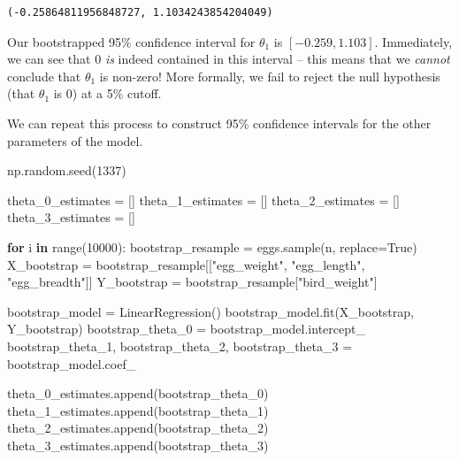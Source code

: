 \documentclass[
  letterpaper,
  DIV=11,
  numbers=noendperiod]{scrreprt}
\newenvironment{Shaded}{\begin{snugshade}}{\end{snugshade}}
\newcommand{\BuiltInTok}[1]{\textcolor[rgb]{0.00,0.23,0.31}{#1}}
\newcommand{\ControlFlowTok}[1]{\textcolor[rgb]{0.00,0.23,0.31}{\textbf{#1}}}
\newcommand{\DecValTok}[1]{\textcolor[rgb]{0.68,0.00,0.00}{#1}}
\newcommand{\KeywordTok}[1]{\textcolor[rgb]{0.00,0.23,0.31}{\textbf{#1}}}
\newcommand{\NormalTok}[1]{\textcolor[rgb]{0.00,0.23,0.31}{#1}}
\newcommand{\OperatorTok}[1]{\textcolor[rgb]{0.37,0.37,0.37}{#1}}
\newcommand{\StringTok}[1]{\textcolor[rgb]{0.13,0.47,0.30}{#1}}
\newcommand{\VariableTok}[1]{\textcolor[rgb]{0.07,0.07,0.07}{#1}}
\begin{document}
\begin{verbatim}
(-0.25864811956848727, 1.1034243854204049)
\end{verbatim}

Our bootstrapped 95\% confidence interval for \(\theta_1\) is
\([-0.259, 1.103]\). Immediately, we can see that 0 \emph{is} indeed
contained in this interval -- this means that we \emph{cannot} conclude
that \(\theta_1\) is non-zero! More formally, we fail to reject the null
hypothesis (that \(\theta_1\) is 0) at a 5\% cutoff.

We can repeat this process to construct 95\% confidence intervals for
the other parameters of the model.

\begin{Shaded}
\begin{Highlighting}[]
\NormalTok{np.random.seed(}\DecValTok{1337}\NormalTok{)}

\NormalTok{theta\_0\_estimates }\OperatorTok{=}\NormalTok{ []}
\NormalTok{theta\_1\_estimates }\OperatorTok{=}\NormalTok{ []}
\NormalTok{theta\_2\_estimates }\OperatorTok{=}\NormalTok{ []}
\NormalTok{theta\_3\_estimates }\OperatorTok{=}\NormalTok{ []}


\ControlFlowTok{for}\NormalTok{ i }\KeywordTok{in} \BuiltInTok{range}\NormalTok{(}\DecValTok{10000}\NormalTok{):}
\NormalTok{    bootstrap\_resample }\OperatorTok{=}\NormalTok{ eggs.sample(n, replace}\OperatorTok{=}\VariableTok{True}\NormalTok{)}
\NormalTok{    X\_bootstrap }\OperatorTok{=}\NormalTok{ bootstrap\_resample[[}\StringTok{"egg\_weight"}\NormalTok{, }\StringTok{"egg\_length"}\NormalTok{, }\StringTok{"egg\_breadth"}\NormalTok{]]}
\NormalTok{    Y\_bootstrap }\OperatorTok{=}\NormalTok{ bootstrap\_resample[}\StringTok{"bird\_weight"}\NormalTok{]}
    
\NormalTok{    bootstrap\_model }\OperatorTok{=}\NormalTok{ LinearRegression()}
\NormalTok{    bootstrap\_model.fit(X\_bootstrap, Y\_bootstrap)}
\NormalTok{    bootstrap\_theta\_0 }\OperatorTok{=}\NormalTok{ bootstrap\_model.intercept\_}
\NormalTok{    bootstrap\_theta\_1, bootstrap\_theta\_2, bootstrap\_theta\_3 }\OperatorTok{=}\NormalTok{ bootstrap\_model.coef\_}
    
\NormalTok{    theta\_0\_estimates.append(bootstrap\_theta\_0)}
\NormalTok{    theta\_1\_estimates.append(bootstrap\_theta\_1)}
\NormalTok{    theta\_2\_estimates.append(bootstrap\_theta\_2)}
\NormalTok{    theta\_3\_estimates.append(bootstrap\_theta\_3)}
    

\end{Highlighting}
\end{Shaded}
\end{document}
